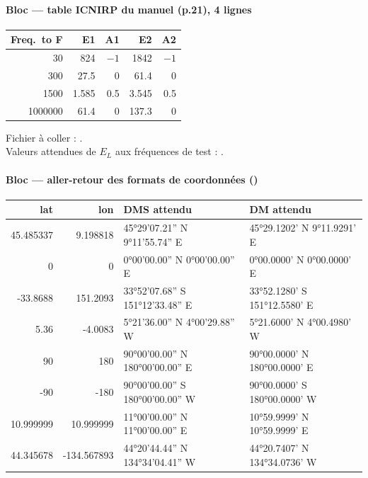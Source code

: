 \paragraph*{Bloc  --- table ICNIRP du manuel (p.21), 4 lignes}
\begin{center}\small\begin{tabular}{@{}rrrrr@{}}\toprule \textbf{Freq.\ to F} & \textbf{E1} & \textbf{A1} & \textbf{E2} & \textbf{A2}\\\midrule 30 & 824 & $-1$ & 1842 & $-1$\\ 300 & 27.5 & 0 & 61.4 & 0\\ 1500 & 1.585 & 0.5 & 3.545 & 0.5\\ 1000000 & 61.4 & 0 & 137.3 & 0\\\bottomrule\end{tabular}\end{center}
Fichier à coller : .\\ Valeurs attendues de $E_L$ aux fréquences de test : .
\paragraph*{Bloc  --- aller-retour des formats de coordonnées ()}
\begin{center}\scriptsize\renewcommand{\arraystretch}{1.1}\begin{tabular}{@{}rrp{4.6cm}p{5.2cm}@{}}\toprule \textbf{lat} & \textbf{lon} & \textbf{DMS attendu} & \textbf{DM attendu}\\\midrule
45.485337 & 9.198818 & 45°29'07.21'' N 9°11'55.74'' E & 45°29.1202' N 9°11.9291' E\\
0 & 0 & 0°00'00.00'' N 0°00'00.00'' E & 0°00.0000' N 0°00.0000' E\\
-33.8688 & 151.2093 & 33°52'07.68'' S 151°12'33.48'' E & 33°52.1280' S 151°12.5580' E\\
5.36 & -4.0083 & 5°21'36.00'' N 4°00'29.88'' W & 5°21.6000' N 4°00.4980' W\\
90 & 180 & 90°00'00.00'' N 180°00'00.00'' E & 90°00.0000' N 180°00.0000' E\\
-90 & -180 & 90°00'00.00'' S 180°00'00.00'' W & 90°00.0000' S 180°00.0000' W\\
10.999999 & 10.999999 & 11°00'00.00'' N 11°00'00.00'' E & 10°59.9999' N 10°59.9999' E\\
44.345678 & -134.567893 & 44°20'44.44'' N 134°34'04.41'' W & 44°20.7407' N 134°34.0736' W\\
\bottomrule\end{tabular}\end{center}

